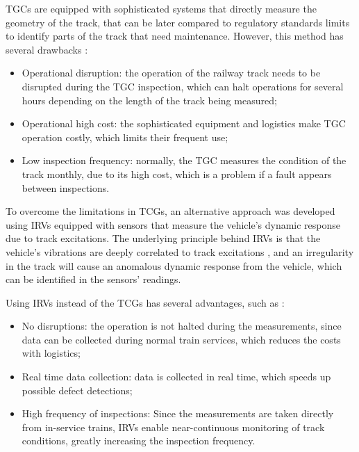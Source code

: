 TGCs are equipped with sophisticated systems that directly measure the geometry of the track, that can be later compared to regulatory standards limits to identify parts of the track that need maintenance. However, this method has several drawbacks \cite{PIRES2024107191,GHIASI2025109516,Hironori_ONO202322-00239}:
\begin{itemize}
    \item Operational disruption: the operation of the railway track needs to be disrupted during the TGC inspection, which can halt operations for several hours depending on the length of the track being measured;
    \item Operational high cost: the sophisticated equipment and logistics make TGC operation costly, which limits their frequent use;
    \item Low inspection frequency: normally, the TGC measures the condition of the track monthly, due to its high cost, which is a problem if a fault appears between inspections.
\end{itemize}

To overcome the limitations in TCGs, an alternative approach was developed using IRVs equipped with sensors that measure the vehicle's dynamic response due to track excitations. The underlying principle behind IRVs is that the vehicle's vibrations are deeply correlated to track excitations \cite{PIRES2024107191,Tsunashima-2019}, and an irregularity in the track will cause an anomalous dynamic response from the vehicle, which can be identified in the sensors' readings. 

Using IRVs instead of the TCGs has several advantages, such as \cite{PIRES2024107191,GHIASI2025109516,Hironori_ONO202322-00239}:
\begin{itemize}
    \item No disruptions: the operation is not halted during the measurements, since data can be collected during normal train services, which reduces the costs with logistics;
    \item Real time data collection: data is collected in real time, which speeds up possible defect detections;
    \item High frequency of inspections: Since the measurements are taken directly from in-service trains, IRVs enable near-continuous monitoring of track conditions, greatly increasing the inspection frequency.
\end{itemize}

